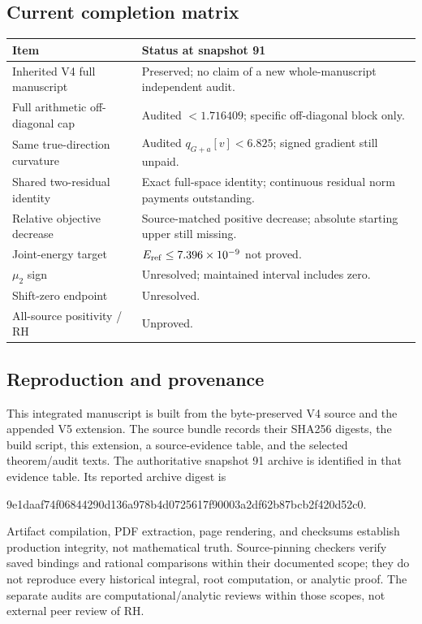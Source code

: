 \documentclass[11pt,a4paper]{article}
\numberwithin{equation}{section}
\theoremstyle{definition}\newtheorem{definition}[theorem]{Definition}
\theoremstyle{remark}\newtheorem{remark}[theorem]{Remark}
\begin{document}
\subsection{Current completion matrix}
\begin{center}\small
\begin{tabularx}{\textwidth}{@{}p{}X@{}}\toprule
Item & Status at snapshot 91\\\midrule
Inherited V4 full manuscript & Preserved; no claim of a new whole-manuscript independent audit.\\
Full arithmetic off-diagonal cap & Audited $<1.716409$; specific off-diagonal block only.\\
Same true-direction curvature & Audited $q_{G+a}[v]<6.825$; signed gradient still unpaid.\\
Shared two-residual identity & Exact full-space identity; continuous residual norm payments outstanding.\\
Relative objective decrease & Source-matched positive decrease; absolute starting upper still missing.\\
Joint-energy target & $E_{\rm ref}\leq7.396\times10^{-9}$ not proved.\\
$\mu_2$ sign & Unresolved; maintained interval includes zero.\\
Shift-zero endpoint & Unresolved.\\
All-source positivity / RH & Unproved.\\\bottomrule
\end{tabularx}\end{center}

\subsection{Reproduction and provenance}
This integrated manuscript is built from the byte-preserved V4 source and the appended V5 extension. The source bundle records their SHA256 digests, the build script, this extension, a source-evidence table, and the selected theorem/audit texts. The authoritative snapshot 91 archive is identified in that evidence table. Its reported archive digest is
\begin{center}\ttfamily\footnotesize
9e1daaf74f06844290d136a978b4d0725617f90003a2df62b87bcb2f420d52c0.
\end{center}
Artifact compilation, PDF extraction, page rendering, and checksums establish production integrity, not mathematical truth. Source-pinning checkers verify saved bindings and rational comparisons within their documented scope; they do not reproduce every historical integral, root computation, or analytic proof. The separate audits are computational/analytic reviews within those scopes, not external peer review of RH.
\end{document}
